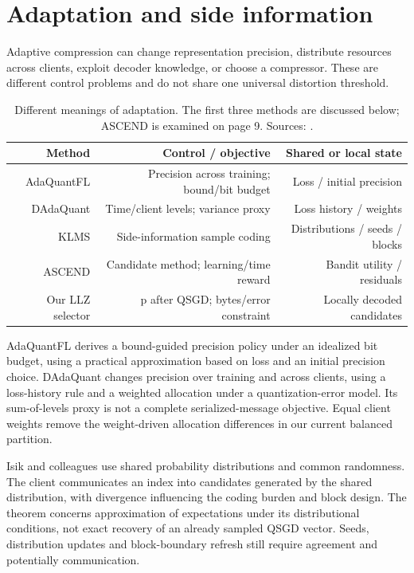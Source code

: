 \documentclass[11pt,a4paper]{article}
\begin{document}
\section{Adaptation and side information}

Adaptive compression can change representation precision, distribute resources across clients, exploit decoder knowledge, or choose a compressor. These are different control problems and do not share one universal distortion threshold.

\begin{table}[htbp]
\centering
\small
\begin{tabularx}{\textwidth}{R{0.69000}R{1.41000}R{0.90000}}
\toprule
\textbf{Method} & \textbf{Control / objective} & \textbf{Shared or local state} \\\midrule
AdaQuantFL & Precision across training; bound/bit budget & Loss / initial precision \\
DAdaQuant & Time/client levels; variance proxy & Loss history / weights \\
KLMS & Side-information sample coding & Distributions / seeds / blocks \\
ASCEND & Candidate method; learning/time reward & Bandit utility / residuals \\
Our LLZ selector & p after QSGD; bytes/error constraint & Locally decoded candidates \\
\bottomrule
\end{tabularx}
\caption{Different meanings of adaptation. The first three methods are discussed below; ASCEND is examined on page 9. Sources: \parencite{jhunjhunwala2021adaquantfl,honig2022dadaquant,isik2024sideinformation,liu2026ascend}.}
\label{tab:adaptive}
\end{table}

AdaQuantFL derives a bound-guided precision policy under an idealized bit budget, using a practical approximation based on loss and an initial precision choice. DAdaQuant changes precision over training and across clients, using a loss-history rule and a weighted allocation under a quantization-error model. Its sum-of-levels proxy is not a complete serialized-message objective. Equal client weights remove the weight-driven allocation differences in our current balanced partition. \parencite{jhunjhunwala2021adaquantfl,honig2022dadaquant}

Isik and colleagues use shared probability distributions and common randomness. The client communicates an index into candidates generated by the shared distribution, with divergence influencing the coding burden and block design. The theorem concerns approximation of expectations under its distributional conditions, not exact recovery of an already sampled QSGD vector. Seeds, distribution updates and block-boundary refresh still require agreement and potentially communication. \parencite{isik2024sideinformation}
\end{document}
